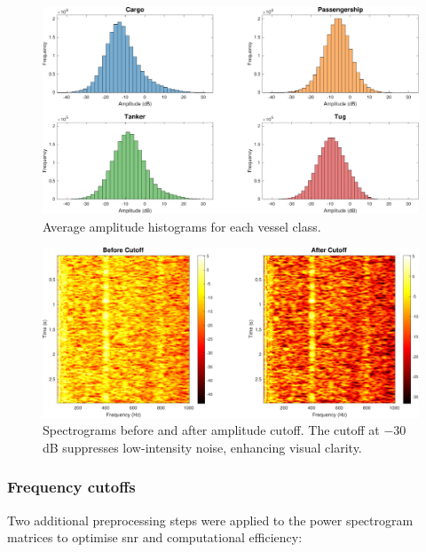 \begin{figure}[htbp]
    \centering
    \includegraphics[width=\textwidth]{img/ch3/ampl_cutoff/averageHistogram.pdf}
    \caption{Average amplitude histograms for each vessel class.}
    \label{fig:ampl-cutoff-histogram}
\end{figure}

\begin{figure}[htbp]
    \centering
    \includegraphics[width=\textwidth]{img/ch3/ampl_cutoff/amplCutoffComparison.pdf}
    \caption{Spectrograms before and after amplitude cutoff. The cutoff at $-30$ dB suppresses low-intensity noise, enhancing visual clarity.}
    \label{fig:ampl-cutoff-spectrogram}
\end{figure}

\subsubsection{Frequency cutoffs}

Two additional preprocessing steps were applied to the power spectrogram matrices to optimise \acrshort{snr} and computational efficiency:

